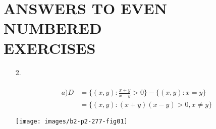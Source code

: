 \documentclass[11pt]{amsbook}
\begin{document}
\section*{ANSWERS TO EVEN NUMBERED \\ EXERCISES}
\begin{enumerate}
    \item[2.]
        \begin{minipage}{0.55\textwidth}
        \begin{align*}        \\
        a)D &= \{(x,y) : \frac{x+y}{x-y} > 0 \} - \{ (x,y) : x=y \} \\
            &= \{(x,y) : (x+y)(x-y) > 0 , x \neq y \} 
        \end{align*}
        \end{minipage} 
        \begin{minipage}{0.55\textwidth}
        \texttt{[image: images/b2-p2-277-fig01]}
        \label{fig: SuerDemirCovers}
        \end{minipage}

    

\end{enumerate}
\end{document}
